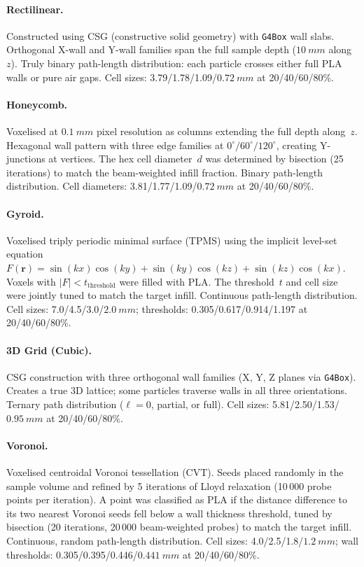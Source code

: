\documentclass[final,5p,times,twocolumn]{elsarticle}
\begin{document}
\paragraph{Rectilinear.}  Constructed using CSG (constructive solid geometry) with \texttt{G4Box} wall slabs.  Orthogonal X-wall and Y-wall families span the full sample depth ($\SI{10}{mm}$ along~$z$).  Truly binary path-length distribution: each particle crosses either full PLA walls or pure air gaps.  Cell sizes: 3.79/1.78/1.09/$\SI{0.72}{mm}$ at 20/40/60/80\%.

\paragraph{Honeycomb.}  Voxelised at $\SI{0.1}{mm}$ pixel resolution as columns extending the full depth along~$z$.  Hexagonal wall pattern with three edge families at $0^\circ/60^\circ/120^\circ$, creating Y-junctions at vertices.  The hex cell diameter~$d$ was determined by bisection (25 iterations) to match the beam-weighted infill fraction.  Binary path-length distribution.  Cell diameters: 3.81/1.77/1.09/$\SI{0.72}{mm}$ at 20/40/60/80\%.

\paragraph{Gyroid.}  Voxelised triply periodic minimal surface (TPMS) using the implicit level-set equation $F(\mathbf{r})=\sin(kx)\cos(ky)+\sin(ky)\cos(kz)+\sin(kz)\cos(kx)$.  Voxels with $|F|<t_{\mathrm{threshold}}$ were filled with PLA.  The threshold~$t$ and cell size were jointly tuned to match the target infill.  Continuous path-length distribution.  Cell sizes: 7.0/4.5/3.0/$\SI{2.0}{mm}$; thresholds: 0.305/0.617/0.914/1.197 at 20/40/60/80\%.

\paragraph{3D Grid (Cubic).}  CSG construction with three orthogonal wall families (X, Y, Z planes via \texttt{G4Box}).  Creates a true 3D lattice; some particles traverse walls in all three orientations.  Ternary path distribution ($\ell = 0$, partial, or full).  Cell sizes: 5.81/2.50/1.53/$\SI{0.95}{mm}$ at 20/40/60/80\%.

\paragraph{Voronoi.}  Voxelised centroidal Voronoi tessellation (CVT).  Seeds placed randomly in the sample volume and refined by 5 iterations of Lloyd relaxation (10\,000 probe points per iteration).  A point was classified as PLA if the distance difference to its two nearest Voronoi seeds fell below a wall thickness threshold, tuned by bisection (20 iterations, 20\,000 beam-weighted probes) to match the target infill.  Continuous, random path-length distribution.  Cell sizes: 4.0/2.5/1.8/$\SI{1.2}{mm}$; wall thresholds: 0.305/0.395/0.446/$\SI{0.441}{mm}$ at 20/40/60/80\%.
\end{document}
